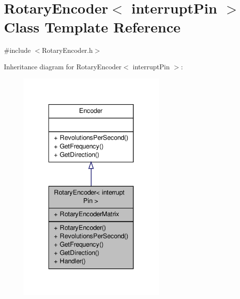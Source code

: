 \hypertarget{class_rotary_encoder}{\section{Rotary\-Encoder$<$ interrupt\-Pin $>$ Class Template Reference}
\label{class_rotary_encoder}
}


{\ttfamily \#include $<$Rotary\-Encoder.\-h$>$}



Inheritance diagram for Rotary\-Encoder$<$ interrupt\-Pin $>$\-:
\nopagebreak
\begin{figure}[H]
\begin{center}
\leavevmode
\includegraphics[width=210pt]{class_rotary_encoder__inherit__graph}
\end{center}
\end{figure}


